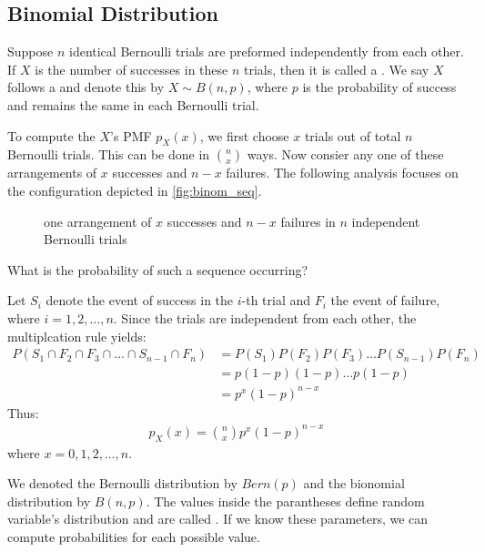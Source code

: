 \subsection{Binomial Distribution}

Suppose \( n \) identical Bernoulli trials are preformed independently from each other.
If \( X \) is the number of successes in these \( n \) trials, then it is called a .
We say \( X \) follows a  and denote this by \( X \sim B(n, p) \),
where \( p \) is the probability of success and remains the same in each Bernoulli trial.

To compute the \( X \)'s PMF \( p_{X}(x) \),
we first choose \( x \) trials out of total \( n \) Bernoulli trials.
This can be done in \( n \choose x \) ways.
Now consier any one of these arrangements of \( x \) successes and \( n - x \) failures.
The following analysis focuses on the configuration depicted in \autoref{fig:binom_seq}.
\begin{figure}[t]
\begin{center}
\end{center}
\caption{one arrangement of \( x \) successes and \( n - x \) failures in \( n \) independent Bernoulli trials}
\label{fig:binom_seq}
\end{figure}
What is the probability of such a sequence occurring?

Let \( S_i \) denote the event of success in the \( i \)-th trial and \( F_i \) the event of failure, where \( i = 1, 2, \ldots, n \).
Since the trials are independent from each other, the multiplcation rule yields:
\begin{align*}
    P(S_1 \cap F_2 \cap F_3 \cap \ldots \cap S_{n - 1} \cap F_{n}) &= P(S_1)P(F_2)P(F_3)\ldots P(S_{n - 1})P(F_n)\\
    &= p(1 - p)(1 - p)\ldots p(1 - p)\\
    &= p^{x}(1 - p)^{n - x}
\end{align*}
Thus:
\begin{gather*}
    p_{X}(x) = \binom{n}{x} p^{x}(1 - p)^{n - x}
\end{gather*}
where \( x = 0, 1, 2, \ldots, n \).

We denoted the Bernoulli distribution by \( Bern(p) \) and the bionomial distribution by \( B(n, p) \).
The values inside the parantheses define random variable's distribution and are called .
If we know these parameters, we can compute probabilities for each possible value.

